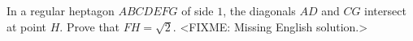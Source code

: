 \problem{}
In a regular heptagon $ABCDEFG$ of side $1$, the diagonals $AD$ and $CG$ intersect at
point $H$.
Prove that $FH = \sqrt{2}$.
\solution
<FIXME: Missing English solution.>
\endproblem
